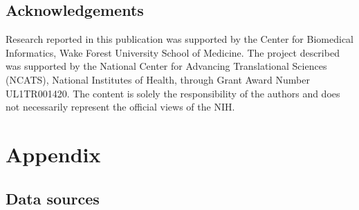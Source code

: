 \documentclass{article}\usepackage[]{graphicx}\usepackage[]{xcolor}
\begin{document}
\subsection*{Acknowledgements}

Research reported in this publication was supported by the Center for Biomedical Informatics, Wake Forest University School of Medicine. The project described was supported by the National Center for Advancing Translational Sciences (NCATS), National Institutes of Health, through Grant Award Number UL1TR001420. The content is solely the responsibility of the authors and does not necessarily represent the official views of the NIH.


\newpage

\appendix

\section*{Appendix}
\captionsetup{labelformat=AppendixTables}
\setcounter{table}{0}

\subsection*{Data sources}
\end{document}
